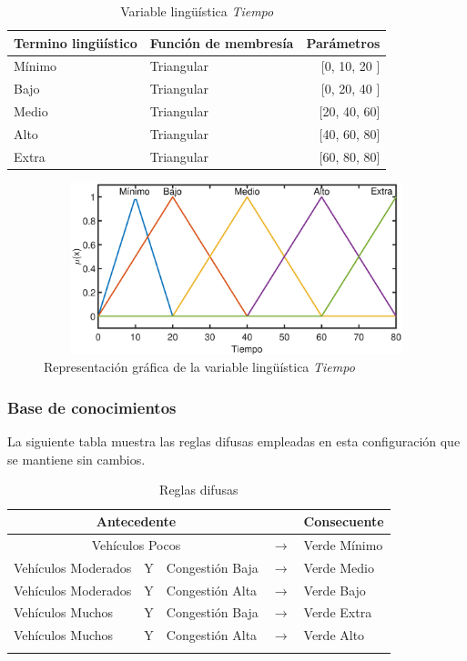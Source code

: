 \begin{table}[!h]
	\centering
	\begin{tabular}{llr} \toprule
		Termino lingüístico & Función de membresía & Parámetros \\ \midrule
		Mínimo & Triangular & [0, 10, 20 ] \\
		Bajo & Triangular & [0, 20, 40 ] \\
		Medio & Triangular & [20, 40, 60] \\
		Alto & Triangular & [40, 60, 80] \\
		Extra & Triangular & [60, 80, 80] \\ \bottomrule
	\end{tabular}
	\caption[Variable lingüística \textit{Tiempo} (configuración \textit{C})]{Variable lingüística \textit{Tiempo}}
\end{table}

\begin{figure}[H]
	\centering
	\includegraphics[height=5cm, width=12cm]{Variables/ConfigC_output1.eps}
	\caption[Representación gráfica de la variable lingüística \textit{Tiempo} (configuración \textit{C})]{Representación gráfica de la variable lingüística \textit{Tiempo}}
\end{figure}

\subsubsection{Base de conocimientos}
La siguiente tabla muestra las reglas difusas empleadas en esta configuración que se mantiene sin cambios.
\begin{longtable}[c]{lclcl} \toprule
	\multicolumn{3}{c}{Antecedente} & & Consecuente \\ \midrule
	\multicolumn{3}{c}{Vehículos Pocos} & $\rightarrow$ & Verde Mínimo \\
	Vehículos Moderados & Y & Congestión Baja& $\rightarrow$ & Verde Medio \\
	Vehículos Moderados & Y & Congestión Alta& $\rightarrow$ & Verde Bajo \\
	Vehículos Muchos &Y& Congestión Baja& $\rightarrow$ & Verde Extra \\
	Vehículos Muchos &Y& Congestión Alta& $\rightarrow$ & Verde Alto \\ \hline
	\caption[Reglas difusas (configuración \textit{C})]{Reglas difusas}
\end{longtable}


